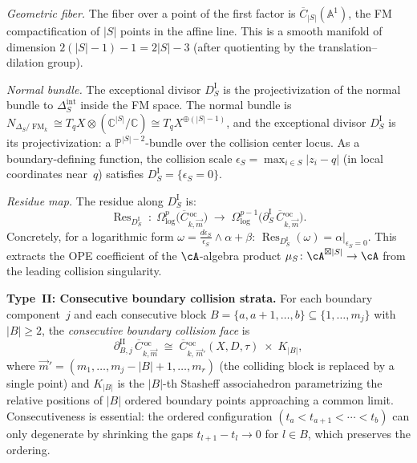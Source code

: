 \begin{proposition}
\emph{Geometric fiber.}
The fiber over a point of the first factor is
$\overline{C}_{|S|}(\mathbb{A}^1)$, the FM compactification of
$|S|$ points in the affine line. This is a smooth manifold of
dimension $2(|S| - 1) - 1 = 2|S| - 3$ (after quotienting by the
translation--dilation group).

\emph{Normal bundle.}
The exceptional divisor $D_S^{\mathrm{I}}$ is the projectivization
of the normal bundle to $\Delta_S^{\mathrm{int}}$ inside the FM
space. The normal bundle is
$N_{\Delta_S/\operatorname{FM}_k} \cong
T_q X \otimes (\mathbb{C}^{|S|}/\mathbb{C})
\cong T_q X^{\oplus(|S|-1)}$,
and the exceptional divisor $D_S^{\mathrm{I}}$ is its
projectivization: a $\mathbb{P}^{|S|-2}$-bundle over
the collision center locus.
As a boundary-defining function, the collision scale
$\epsilon_S = \max_{i \in S} |z_i - q|$ (in local coordinates
near~$q$) satisfies $D_S^{\mathrm{I}} = \{\epsilon_S = 0\}$.

\emph{Residue map.}
The residue along $D_S^{\mathrm{I}}$ is:
\begin{equation}\label{eq:typeI-residue}
\operatorname{Res}_{D_S^{\mathrm{I}}}
\;\colon\;
\Omega^p_{\log}\bigl(
\overline{C}{}^{\,\mathrm{oc}}_{k,\vec{m}}\bigr)
\;\longrightarrow\;
\Omega^{p-1}_{\log}\bigl(
\partial_S^{\mathrm{I}}\,
\overline{C}{}^{\,\mathrm{oc}}_{k,\vec{m}}\bigr).
\end{equation}
Concretely, for a logarithmic form
$\omega = \frac{d\epsilon_S}{\epsilon_S} \wedge \alpha + \beta$:
$\operatorname{Res}_{D_S^{\mathrm{I}}}(\omega) = \alpha|_{\epsilon_S=0}$.
This extracts the OPE coefficient of the $\cA$-algebra product
$\mu_S \colon \cA^{\boxtimes |S|} \to \cA$ from the leading
collision singularity.

\medskip
\noindent\textbf{Type~II: Consecutive boundary collision strata.}
For each boundary component~$j$ and each consecutive block
$B = \{a, a{+}1, \ldots, b\} \subseteq \{1, \ldots, m_j\}$
with $|B| \geq 2$, the
\emph{consecutive boundary collision face} is
\begin{equation}\label{eq:typeII-stratum}
\partial_{B,j}^{\mathrm{II}}\,
\overline{C}{}^{\,\mathrm{oc}}_{k,\vec{m}}
\;\cong\;
\overline{C}{}^{\,\mathrm{oc}}_{k,\, \vec{m}'}(X, D, \tau)
\;\times\;
K_{|B|},
\end{equation}
where $\vec{m}' = (m_1, \ldots, m_j - |B| + 1, \ldots, m_r)$
(the colliding block is replaced by a single point) and $K_{|B|}$
is the $|B|$-th Stasheff associahedron parametrizing the relative
positions of $|B|$ ordered boundary points approaching a common
limit. Consecutiveness is essential: the ordered configuration
$(t_a < t_{a+1} < \cdots < t_b)$ can only degenerate by
shrinking the gaps $t_{l+1} - t_l \to 0$ for $l \in B$, which
preserves the ordering.


\end{proposition}
